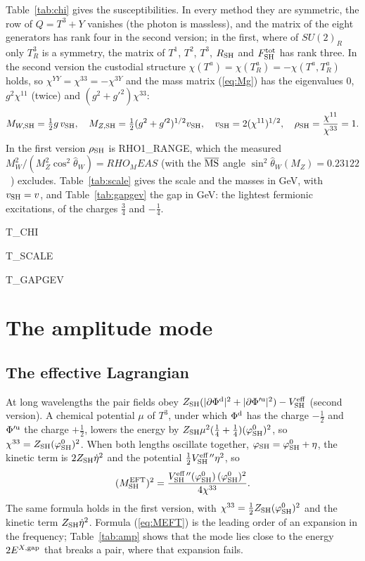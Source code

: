 \documentclass[aps,prd,onecolumn,superscriptaddress,nofootinbib,floatfix,longbibliography]{revtex4-2}
\newcommand{\SH}{{\rm SH}}
\begin{document}
Table~\ref{tab:chi} gives the susceptibilities. In every method they are symmetric, the row of $Q=T^3+Y$ vanishes (the
photon is massless), and the matrix of the eight generators has rank four in the second version; in the first, where of
$SU(2)_R$ only $T^3_R$ is a symmetry, the matrix of $T^1$, $T^2$, $T^3$, $R_\SH$ and $F^{\rm tot}_\SH$ has rank three. In
the second version the custodial structure $\chi(T^a)=\chi(T^a_R)=-\chi(T^a,T^a_R)$ holds, so $\chi^{YY}=\chi^{33}=-\chi^{3Y}$
and the mass matrix (\ref{eq:Mg}) has the eigenvalues $0$, $g^2\chi^{11}$ (twice) and $(g^2+g'^2)\chi^{33}$:
\begin{equation}
M_{W,\SH}=\tfrac12g\,v_\SH,\quad M_{Z,\SH}=\tfrac12(g^2+g'^2)^{1/2}v_\SH,\quad v_\SH=2(\chi^{11})^{1/2},\quad
\rho_\SH=\frac{\chi^{11}}{\chi^{33}}=1 .
\label{eq:rho}
\end{equation}
In the first version $\rho_\SH$ is {{RHO1_RANGE}}, which the measured $M_W^2/(M_Z^2\cos^2\hat\theta_W)={{RHO_MEAS}}$ (with the
$\overline{\rm MS}$ angle $\sin^2\hat\theta_W(M_Z)=0.23122$~\cite{PDG2026}) excludes. Table~\ref{tab:scale} gives the scale
and the masses in GeV, with $v_\SH=v$, and Table~\ref{tab:gapgev} the gap in GeV: the lightest fermionic excitations, of
the charges $\frac34$ and $-\frac14$.

{{T_CHI}}

{{T_SCALE}}

{{T_GAPGEV}}

\section{The amplitude mode}
\label{sec:amplitude}

\subsection{The effective Lagrangian}

At long wavelengths the pair fields obey $Z_\SH(|\partial\Phi^{\rm d}|^2+|\partial\Phi'^{\rm u}|^2)-V^{\rm eff}_\SH$ (second
version). A chemical potential $\mu$ of $T^3$, under which $\Phi^{\rm d}$ has the charge $-\frac12$ and $\Phi'^{\rm u}$ the
charge $+\frac12$, lowers the energy by $Z_\SH\mu^2(\frac14+\frac14)(\varphi^0_\SH)^2$, so $\chi^{33}=Z_\SH(\varphi^0_\SH)^2$.
When both lengths oscillate together, $\varphi_\SH=\varphi^0_\SH+\eta$, the kinetic term is $2Z_\SH\dot\eta^2$ and the potential
$\frac12V^{\rm eff\,\prime\prime}_\SH\eta^2$, so
\begin{equation}
(M^{\rm EFT}_\SH)^2=\frac{V^{\rm eff\,\prime\prime}_\SH(\varphi^0_\SH)\,(\varphi^0_\SH)^2}{4\chi^{33}} .
\label{eq:MEFT}
\end{equation}
The same formula holds in the first version, with $\chi^{33}=\frac12Z_\SH(\varphi^0_\SH)^2$ and the kinetic term
$Z_\SH\dot\eta^2$. Formula (\ref{eq:MEFT}) is the leading order of an expansion in the frequency; Table~\ref{tab:amp} shows that
the mode lies close to the energy $2E^{X,{\rm gap}}$ that breaks a pair, where that expansion fails.
\end{document}
